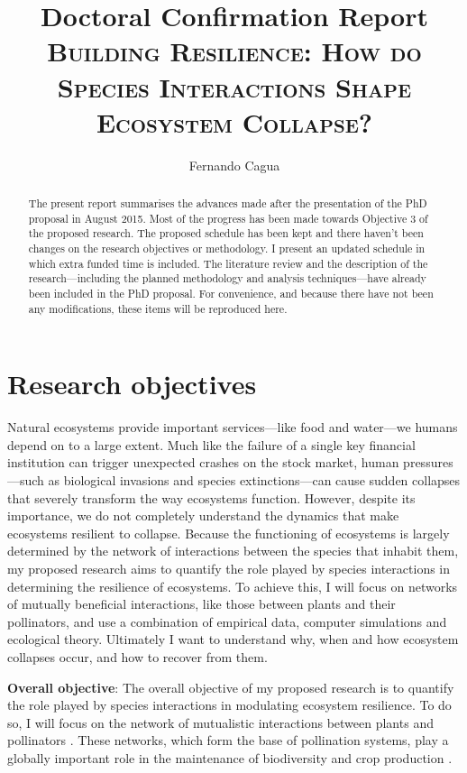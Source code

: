 \documentclass[a4paper]{article}
\title{
	{\normalsize Doctoral Confirmation Report} \\
	{\LARGE \textsc{Building Resilience: How do Species Interactions Shape Ecosystem Collapse?}}
}
\author{
  {\large Fernando Cagua}
}
\date{}
\begin{document}
\maketitle


\begin{abstract}
The present report summarises the advances made after the presentation of the PhD proposal in August 2015. Most of the progress has been made towards Objective 3 of the proposed research. The proposed schedule has been kept and there haven't been changes on the research objectives or methodology. I present an updated schedule in which extra funded time is included. The literature review and the description of the research---including the planned methodology and analysis techniques---have already been included in the PhD proposal. For convenience, and because there have not been any modifications, these items will be reproduced here. 

\end{abstract}





\section*{Research objectives}

Natural ecosystems provide important services---like food and water---we humans depend on to a large extent.
Much like the failure of a single key financial institution can trigger unexpected crashes on the stock market, human pressures---such as biological invasions and species extinctions---can cause sudden collapses that severely transform the way ecosystems function.
However, despite its importance, we do not completely understand the dynamics that make ecosystems resilient to collapse.
Because the functioning of ecosystems is largely determined by the network of interactions between the species that inhabit them, my proposed research aims to quantify the role played by species interactions in determining the resilience of ecosystems.
To achieve this, I will focus on networks of mutually beneficial interactions, like those between plants and their pollinators, and use a combination of empirical data, computer simulations and ecological theory.
Ultimately I want to understand why, when and how ecosystem collapses occur, and how to recover from them.
  
\textbf{Overall objective}: The overall objective of my proposed research is to quantify the role played by species interactions in modulating ecosystem resilience. 
To do so, I will focus on the network of mutualistic interactions between plants and pollinators \autocite{Bascompte2006, Bascompte2007, Klein2007}.
These networks, which form the base of pollination systems, play a globally important role in the maintenance of biodiversity and crop production \autocite{Bascompte2007, Klein2007}.
\end{document}
